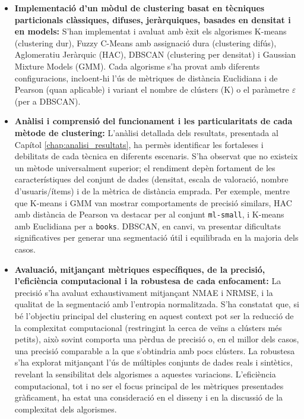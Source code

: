 \documentclass[a4paper,12pt]{report}
\begin{document}
\begin{itemize}
    \item \textbf{Implementació d'un mòdul de clustering basat en tècniques particionals clàssiques, difuses, jeràrquiques, basades en densitat i en models:} S'han implementat i avaluat amb èxit els algorismes K-means (clustering dur), Fuzzy C-Means amb assignació dura (clustering difús), Aglomeratiu Jeràrquic (HAC), DBSCAN (clustering per densitat) i Gaussian Mixture Models (GMM). Cada algorisme s'ha provat amb diferents configuracions, incloent-hi l'ús de mètriques de distància Euclidiana i de Pearson (quan aplicable) i variant el nombre de clústers (K) o el paràmetre \(\varepsilon\) (per a DBSCAN).

    \item \textbf{Anàlisi i comprensió del funcionament i les particularitats de cada mètode de clustering:} L'anàlisi detallada dels resultats, presentada al Capítol \ref{chap:analisi_resultats}, ha permès identificar les fortaleses i debilitats de cada tècnica en diferents escenaris. S'ha observat que no existeix un mètode universalment superior; el rendiment depèn fortament de les característiques del conjunt de dades (densitat, escala de valoració, nombre d'usuaris/ítems) i de la mètrica de distància emprada. Per exemple, mentre que K-means i GMM van mostrar comportaments de precisió similars, HAC amb distància de Pearson va destacar per al conjunt \texttt{ml-small}, i K-means amb Euclidiana per a \texttt{books}. DBSCAN, en canvi, va presentar dificultats significatives per generar una segmentació útil i equilibrada en la majoria dels casos.

    \item \textbf{Avaluació, mitjançant mètriques específiques, de la precisió, l'eficiència computacional i la robustesa de cada enfocament:} La precisió s'ha avaluat exhaustivament mitjançant NMAE i NRMSE, i la qualitat de la segmentació amb l'entropia normalitzada. S'ha constatat que, si bé l'objectiu principal del clustering en aquest context pot ser la reducció de la complexitat computacional (restringint la cerca de veïns a clústers més petits), això sovint comporta una pèrdua de precisió o, en el millor dels casos, una precisió comparable a la que s'obtindria amb pocs clústers. La robustesa s'ha explorat mitjançant l'ús de múltiples conjunts de dades reals i sintètics, revelant la sensibilitat dels algorismes a aquestes variacions. L'eficiència computacional, tot i no ser el focus principal de les mètriques presentades gràficament, ha estat una consideració en el disseny i en la discussió de la complexitat dels algorismes.


\end{itemize}
\end{document}
